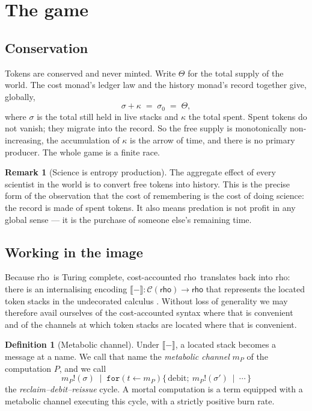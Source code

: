 \documentclass[11pt]{article}
\theoremstyle{plain}
\theoremstyle{definition}
\newtheorem{definition}[theorem]{Definition}
\newtheorem{remark}[theorem]{Remark}
\newcommand{\rhoc}{\textsf{rho}}
\newcommand{\Crho}{\mathcal{C}(\rhoc)}
\newcommand{\enc}[1]{\llbracket #1 \rrbracket}
\begin{document}
\section{The game}
\label{sec:game}

\subsection{Conservation}

Tokens are conserved and never minted. Write $\Theta$ for the total supply of the world. The cost
monad's ledger law and the history monad's record together give, globally,
\[
\sigma + \kappa \;=\; \sigma_0 \;=\; \Theta ,
\]
where $\sigma$ is the total still held in live stacks and $\kappa$ the total spent. Spent tokens do
not vanish; they migrate into the record. So the free supply is monotonically non-increasing, the
accumulation of $\kappa$ is the arrow of time, and there is no primary producer. The whole game is a
finite race.

\begin{remark}[Science is entropy production]
The aggregate effect of every scientist in the world is to convert free tokens into history. This is
the precise form of the observation that the cost of remembering is the cost of doing science: the
record is made of spent tokens. It also means predation is not profit in any global sense --- it is
the purchase of someone else's remaining time.
\end{remark}

\subsection{Working in the image}
\label{sec:image}

Because \rhoc\ is Turing complete, cost-accounted \rhoc\ translates back into \rhoc: there is an
internalising encoding $\enc{-} : \Crho \to \rhoc$ that represents the located token stacks in the
undecorated calculus \cite[\S6]{Omnibus}. Without loss of generality we may therefore avail ourselves
of the cost-accounted syntax where that is convenient and of the channels at which token stacks are
located where that is convenient.

\begin{definition}[Metabolic channel]
\label{def:metabolic}
Under $\enc{-}$, a located stack becomes a message at a name. We call that name the \emph{metabolic
channel} $m_P$ of the computation $P$, and we call
\[
m_P!(\sigma) \;\mid\; \texttt{for}(t \leftarrow m_P)\{\, \text{debit};\ m_P!(\sigma')\ \mid\ \cdots \,\}
\]
the \emph{reclaim--debit--reissue} cycle. A mortal computation is a term equipped with a metabolic
channel executing this cycle, with a strictly positive burn rate.
\end{definition}
\end{document}
